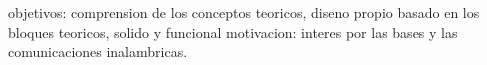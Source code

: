 objetivos: comprension de los conceptos teoricos, diseno propio basado en los bloques teoricos, solido y funcional 
motivacion: interes por las bases y las comunicaciones inalambricas.
